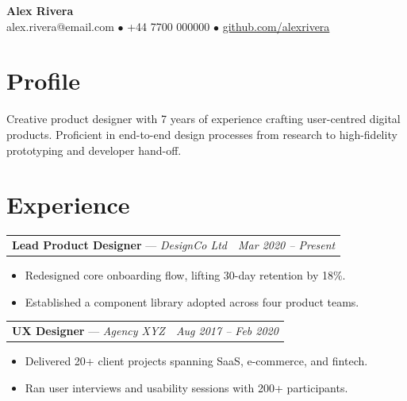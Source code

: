 \documentclass[10pt,a4paper]{article}
\begin{document}
\pagestyle{empty}

\begin{center}
    {\Huge \textbf{\color{accent}Alex Rivera}} \\[6pt]
    \small
    alex.rivera@email.com \quad $\bullet$ \quad +44 7700 000000 \quad $\bullet$ \quad
    \href{https://github.com/alexrivera}{github.com/alexrivera}
\end{center}

\vspace{4pt}

\section{Profile}
Creative product designer with 7 years of experience crafting user-centred
digital products. Proficient in end-to-end design processes from research
to high-fidelity prototyping and developer hand-off.

\section{Experience}

\noindent
\begin{tabularx}{\textwidth}{@{}X r@{}}
    \textbf{Lead Product Designer} --- \textit{DesignCo Ltd} & \textit{Mar 2020 -- Present}
\end{tabularx}
\begin{itemize}[nosep, left=12pt, topsep=2pt]
    \item Redesigned core onboarding flow, lifting 30-day retention by 18\%.
    \item Established a component library adopted across four product teams.
\end{itemize}

\vspace{4pt}

\noindent
\begin{tabularx}{\textwidth}{@{}X r@{}}
    \textbf{UX Designer} --- \textit{Agency XYZ} & \textit{Aug 2017 -- Feb 2020}
\end{tabularx}
\begin{itemize}[nosep, left=12pt, topsep=2pt]
    \item Delivered 20+ client projects spanning SaaS, e-commerce, and fintech.
    \item Ran user interviews and usability sessions with 200+ participants.
\end{itemize}
\end{document}
